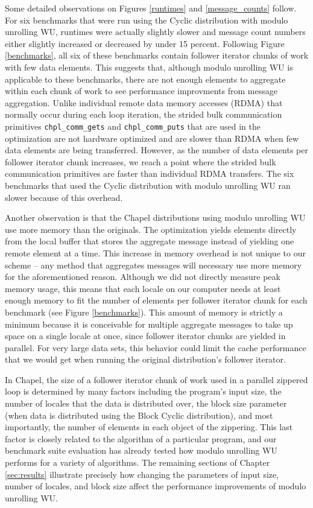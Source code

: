 Some detailed observations on Figures \ref{runtimes} and \ref{message_counts} follow. For six benchmarks that were run using the Cyclic distribution with modulo unrolling WU, runtimes were actually slightly slower and message count numbers either slightly increased or decreased by under 15 percent. Following Figure \ref{benchmarks}, all six of these benchmarks contain follower iterator chunks of work with few data elements. This suggests that, although modulo unrolling WU is applicable to these benchmarks, there are not enough elements to aggregate within each chunk of work to see performance improvments from message aggregation. Unlike individual remote data memory accesses (RDMA) that normally occur during each loop iteration, the strided bulk communication primitives \texttt{chpl\_comm\_gets} and \texttt{chpl\_comm\_puts} that are used in the optimization are not hardware optimized and are slower than RDMA when few data elements are being transferred. However, as the number of data elements per follower iterator chunk increases, we reach a point where the strided bulk communication primitives are faster than individual RDMA transfers. The six benchmarks that used the Cyclic distribution with modulo unrolling WU ran slower because of this overhead. 

Another observation is that the Chapel distributions using modulo unrolling WU use more memory than the originals. The optimization yields elements directly from the local buffer that stores the aggregate message instead of yielding one remote element at a time. This increase in memory overhead is not unique to our scheme -- any method that aggregates messages will necessary use more memory for the aforementioned reason. Although we did not directly measure peak memory usage, this means that each locale on our computer needs at least enough memory to fit the number of elements per follower iterator chunk for each benchmark (see Figure \ref{benchmarks}). This amount of memory is strictly a minimum because it is conceivable for multiple aggregate messages to take up space on a single locale at once, since follower iterator chunks are yielded in parallel. For very large data sets, this behavior could limit the cache performance that we would get when running the original distribution's follower iterator. 

In Chapel, the size of a follower iterator chunk of work used in a parallel zippered loop is determined by many factors including the program's input size, the number of locales that the data is distributed over, the block size parameter (when data is distributed using the Block Cyclic distribution), and most importantly, the number of elements in each object of the zippering. This last factor is closely related to the algorithm of a particular program, and our benchmark suite evaluation has already tested how modulo unrolling WU performs for a variety of algorithms. The remaining sections of Chapter \ref{sec:results} illustrate precisely how changing the parameters of input size, number of locales, and block size affect the performance improvements of modulo unrolling WU.

